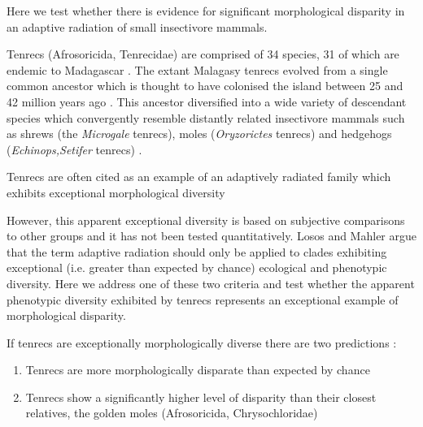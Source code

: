\documentclass[12pt,a4paper]{article}
\begin{document}


Here we test whether there is evidence for significant morphological disparity in an adaptive radiation of small insectivore %
mammals.

Tenrecs (Afrosoricida, Tenrecidae) are comprised of 34 species, 31 of which are endemic to Madagascar \citep{Olson2013}. The extant Malagasy tenrecs evolved from a single common ancestor \citep{Asher2006} which is thought to have colonised the island between 25 and 42 million years ago \citep{Samonds2013} %
. This ancestor diversified into a wide variety of descendant species which convergently resemble distantly related insectivore mammals such as shrews (the \textit{Microgale} tenrecs), moles (\textit{Oryzorictes} tenrecs) and hedgehogs (\textit{Echinops,Setifer} tenrecs) \citep{Eisenberg1969}.

Tenrecs are often cited as an example of an adaptively radiated family which exhibits exceptional morphological diversity \citep{Soarimalala2011, Olson2003, Eisenberg1969}


However, this apparent exceptional diversity is based on subjective comparisons to other groups and it has not been tested quantitatively. Losos and Mahler \citeyearpar{Losos2010a} argue that the term adaptive radiation should only be applied to clades exhibiting exceptional (i.e. greater than expected by chance) ecological and phenotypic diversity.
Here we address one of these two criteria and test whether the apparent phenotypic diversity exhibited by tenrecs represents an exceptional example of morphological disparity. 

If tenrecs are exceptionally morphologically diverse there are two predictions \citep{Losos2010a}:   
\begin{enumerate}
\item Tenrecs are more morphologically disparate than expected by chance
\item Tenrecs show a significantly higher level of disparity than their closest relatives, the golden moles (Afrosoricida, Chrysochloridae)
\end{enumerate}
\end{document}
